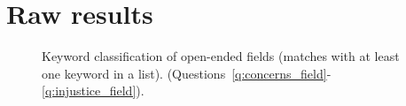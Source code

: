 \clearpage
\section{Raw results%
}\label{app:raw_results}


\begin{figure}[h!]
    \caption[Keyword classification of open-ended fields]{Keyword classification of open-ended fields (matches with at least one keyword in a list). (Questions~\ref{q:concerns_field}-\ref{q:injustice_field}).
    }\label{fig:field_keyword}
\end{figure}

